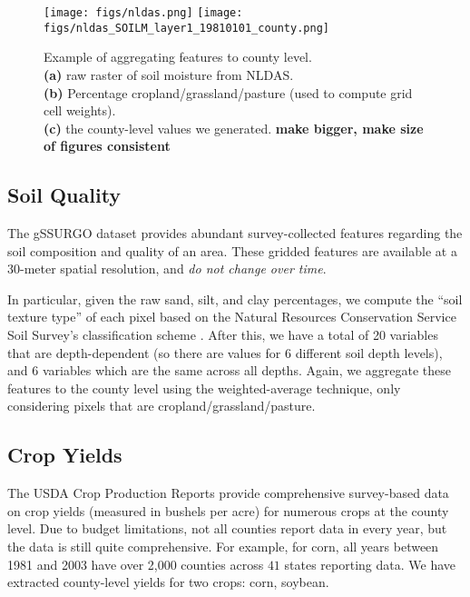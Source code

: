 \begin{figure}[t]
\centering
\texttt{[image: figs/nldas.png]}
\texttt{[image: figs/nldas\_SOILM\_layer1\_19810101\_county.png]}
\caption{Example of aggregating features to county level. \\
\textbf{(a)} raw raster of soil moisture from NLDAS. \\
\textbf{(b)} Percentage cropland/grassland/pasture (used to compute grid cell weights).\\
\textbf{(c)} the county-level values we generated. \textbf{make bigger, make size of figures consistent}}
\label{aggregating_to_county}
\end{figure}

\subsection{Soil Quality}

The gSSURGO dataset \cite{soil2019gridded} provides abundant survey-collected features regarding the soil composition and quality of an area. These gridded features are available at a 30-meter spatial resolution, and \emph{do not change over time}.

In particular, given the raw sand, silt, and clay percentages, we compute the ``soil texture type'' of each pixel based on the Natural Resources Conservation Service Soil Survey's classification scheme \cite{soiltexture}. After this, we have a total of 20 variables that are depth-dependent (so there are values for 6 different soil depth levels), and 6 variables which are the same across all depths. Again, we aggregate these features to the county level using the weighted-average technique, only considering pixels that are cropland/grassland/pasture.

\subsection{Crop Yields}

The USDA Crop Production Reports \cite{usda2013national} provide comprehensive survey-based data on crop yields (measured in bushels per acre) for numerous crops at the county level. Due to budget limitations, not all counties report data in every year, but the data is still quite comprehensive. For example, for corn, all years between 1981 and 2003 have over 2,000 counties across $41$ states reporting data. We have extracted county-level yields for two crops: corn, soybean. 

